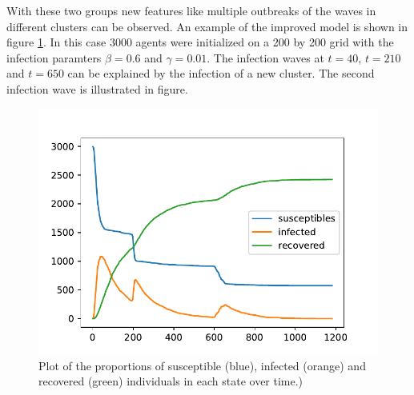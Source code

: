 With these two groups new features like multiple outbreaks of the waves in different clusters can be observed. An example of the improved model is shown in figure \ref{fig:multipleOutbreaks}. In this case 3000 agents were initialized on a 200 by 200 grid with the infection paramters $\beta=0.6$ and $\gamma = 0.01$. The infection waves at $t = 40$, $t = 210$ and $t= 650$ can be explained by the infection of a new cluster. The second infection wave is illustrated in figure. 

\begin{figure}[H]
	\centering
	\includegraphics[width=0.7\linewidth]{img/multipleOutbreaks.pdf}
	\caption{Plot  of  the  proportions  of  susceptible  (blue),  infected  (orange)  and  recovered  (green)  individuals  in  each  state over time.)}%
	\label{fig:multipleOutbreaks}
\end{figure}


